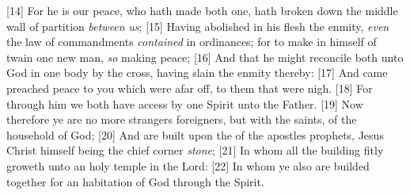 [14] \textcolor[cmyk]{0.99998,1,0,0}{For he is our peace, who hath made both one,  hath broken down the middle wall of partition \emph{between} \emph{us};}
[15] \textcolor[cmyk]{0.99998,1,0,0}{Having abolished in his flesh the enmity, \emph{even} the law of commandments \emph{contained} in ordinances; for to make in himself of twain one new man, \emph{so} making peace;}
[16] \textcolor[cmyk]{0.99998,1,0,0}{And that he might reconcile both unto God in one body by the cross, having slain the enmity thereby:}
[17] \textcolor[cmyk]{0.99998,1,0,0}{And came  preached peace to you which were afar off,  to them that were nigh.}
[18] \textcolor[cmyk]{0.99998,1,0,0}{For through him we both have access by one Spirit unto the Father.}
[19] \textcolor[cmyk]{0.99998,1,0,0}{Now therefore ye are no more strangers  foreigners, but  with the saints,  of the household of God;}
[20] \textcolor[cmyk]{0.99998,1,0,0}{And are built upon the  of the apostles  prophets, Jesus Christ himself being the chief corner \emph{stone};}
[21] \textcolor[cmyk]{0.99998,1,0,0}{In whom all the building fitly  groweth unto an holy temple in the Lord:}
[22] \textcolor[cmyk]{0.99998,1,0,0}{In whom ye also are builded together for an habitation of God through the Spirit.}